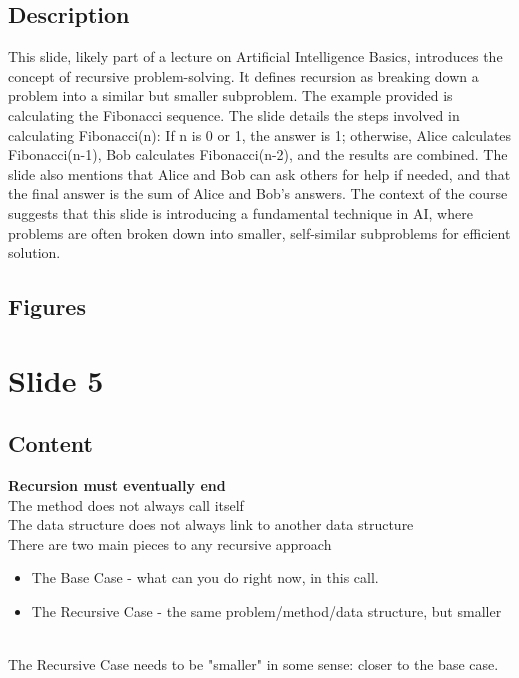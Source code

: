 \documentclass{article}%
\begin{document}
\subsection{Description}%
This slide, likely part of a lecture on Artificial Intelligence Basics, introduces the concept of recursive problem-solving.  It defines recursion as breaking down a problem into a similar but smaller subproblem.  The example provided is calculating the Fibonacci sequence.  The slide details the steps involved in calculating Fibonacci(n):  If n is 0 or 1, the answer is 1; otherwise, Alice calculates Fibonacci(n-1), Bob calculates Fibonacci(n-2), and the results are combined.  The slide also mentions that Alice and Bob can ask others for help if needed, and that the final answer is the sum of Alice and Bob's answers.  The context of the course suggests that this slide is introducing a fundamental technique in AI, where problems are often broken down into smaller, self-similar subproblems for efficient solution.%
\subsection{Figures}%
\begin{figure}[H]%
\centering%
\end{figure}

%
\newpage%
\section{Slide 5}%
\label{sec:Slide5}%
\subsection{Content}%

\textbf{Recursion must eventually end} \\
The method does not always call itself \\
The data structure does not always link to another data structure \\
There are two main pieces to any recursive approach \\
\begin{itemize}
    \item The Base Case - what can you do right now, in this call.
    \item The Recursive Case - the same problem/method/data structure, but smaller
\end{itemize} \\
The Recursive Case needs to be "smaller" in some sense: closer to the base case.
%
\end{document}
